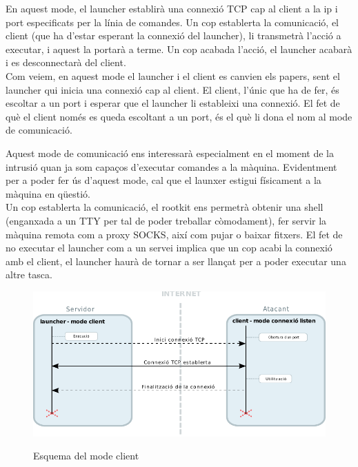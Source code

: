 En aquest mode, el launcher establirà una connexió TCP cap al client a la ip i port especificats per la línia
de comandes. Un cop establerta la comunicació, el client (que ha d'estar esperant la connexió del launcher), 
li transmetrà l'acció a executar, i aquest la portarà a terme. Un cop acabada l'acció, el launcher acabarà
i es desconnectarà del client. \\

Com veiem, en aquest mode el launcher i el client es canvien els papers, sent el launcher qui inicia una connexió 
cap al client. El client, l'únic que ha de fer, és escoltar a un port i esperar que el launcher li estableixi
una connexió. El fet de què el client només es queda escoltant a un port, és el què li dona el nom al mode de
comunicació.

Aquest mode de comunicació ens interessarà especialment en el moment de la intrusió quan ja som capaços d'executar
comandes a la màquina. Evidentment per a poder fer ús d'aquest mode, cal que el launxer estigui físicament
a la màquina en qüestió. \\

Un cop establerta la comunicació, el rootkit ens permetrà obtenir una shell (enganxada a un TTY per tal de poder treballar 
còmodament), fer servir la màquina remota com a proxy SOCKS, així com pujar o baixar fitxers. El fet de no executar el 
launcher com a un servei implica que un cop acabi la connexió amb el client, el launcher haurà de tornar a ser llançat 
per a poder executar una altre tasca. \\

\begin{figure}[htp]
    \centering
    \includegraphics[scale=1.2,keepaspectratio]{diagrames/solutionDesignClientMode.pdf} \\
    \caption{Esquema del mode client}
    \label{fig:modeClient}
\end{figure}


